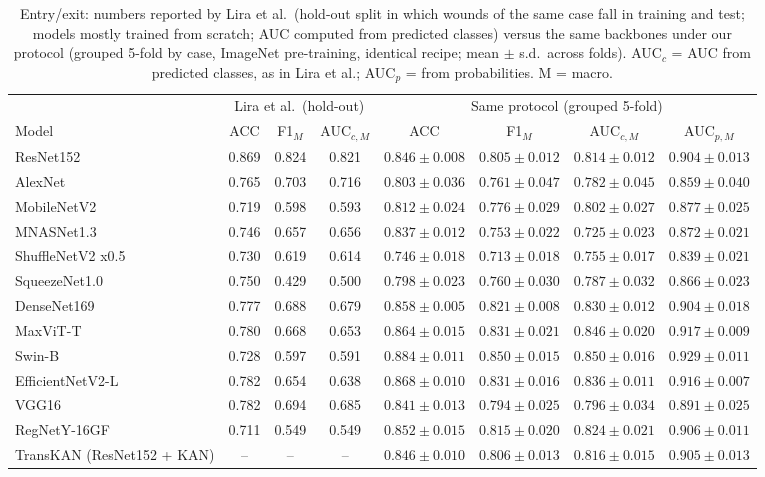 \begin{table}[t]
\centering
\caption{Entry/exit: numbers reported by Lira et al.\ (hold-out split in which wounds of the same case fall in training and test; models mostly trained from scratch; AUC computed from predicted classes) versus the same backbones under our protocol (grouped 5-fold by case, ImageNet pre-training, identical recipe; mean $\pm$ s.d.\ across folds). AUC$_c$ = AUC from predicted classes, as in Lira et al.; AUC$_p$ = from probabilities. M = macro.}
\label{tab:comparacao2024_es}
\scriptsize
\setlength{\tabcolsep}{3pt}
\begin{tabular}{lccc|cccc}
\hline
 & \multicolumn{3}{c|}{Lira et al.\ (hold-out)} & \multicolumn{4}{c}{Same protocol (grouped 5-fold)} \\
Model & ACC & F1$_M$ & AUC$_{c,M}$ & ACC & F1$_M$ & AUC$_{c,M}$ & AUC$_{p,M}$ \\
\hline
ResNet152 & 0.869 & 0.824 & 0.821 & $0.846\pm0.008$ & $0.805\pm0.012$ & $0.814\pm0.012$ & $0.904\pm0.013$ \\
AlexNet & 0.765 & 0.703 & 0.716 & $0.803\pm0.036$ & $0.761\pm0.047$ & $0.782\pm0.045$ & $0.859\pm0.040$ \\
MobileNetV2 & 0.719 & 0.598 & 0.593 & $0.812\pm0.024$ & $0.776\pm0.029$ & $0.802\pm0.027$ & $0.877\pm0.025$ \\
MNASNet1.3 & 0.746 & 0.657 & 0.656 & $0.837\pm0.012$ & $0.753\pm0.022$ & $0.725\pm0.023$ & $0.872\pm0.021$ \\
ShuffleNetV2 x0.5 & 0.730 & 0.619 & 0.614 & $0.746\pm0.018$ & $0.713\pm0.018$ & $0.755\pm0.017$ & $0.839\pm0.021$ \\
SqueezeNet1.0 & 0.750 & 0.429 & 0.500 & $0.798\pm0.023$ & $0.760\pm0.030$ & $0.787\pm0.032$ & $0.866\pm0.023$ \\
DenseNet169 & 0.777 & 0.688 & 0.679 & $0.858\pm0.005$ & $0.821\pm0.008$ & $0.830\pm0.012$ & $0.904\pm0.018$ \\
MaxViT-T & 0.780 & 0.668 & 0.653 & $0.864\pm0.015$ & $0.831\pm0.021$ & $0.846\pm0.020$ & $0.917\pm0.009$ \\
Swin-B & 0.728 & 0.597 & 0.591 & $0.884\pm0.011$ & $0.850\pm0.015$ & $0.850\pm0.016$ & $0.929\pm0.011$ \\
EfficientNetV2-L & 0.782 & 0.654 & 0.638 & $0.868\pm0.010$ & $0.831\pm0.016$ & $0.836\pm0.011$ & $0.916\pm0.007$ \\
VGG16 & 0.782 & 0.694 & 0.685 & $0.841\pm0.013$ & $0.794\pm0.025$ & $0.796\pm0.034$ & $0.891\pm0.025$ \\
RegNetY-16GF & 0.711 & 0.549 & 0.549 & $0.852\pm0.015$ & $0.815\pm0.020$ & $0.824\pm0.021$ & $0.906\pm0.011$ \\
TransKAN (ResNet152 + KAN) & -- & -- & -- & $0.846\pm0.010$ & $0.806\pm0.013$ & $0.816\pm0.015$ & $0.905\pm0.013$ \\
\hline
\end{tabular}
\end{table}
